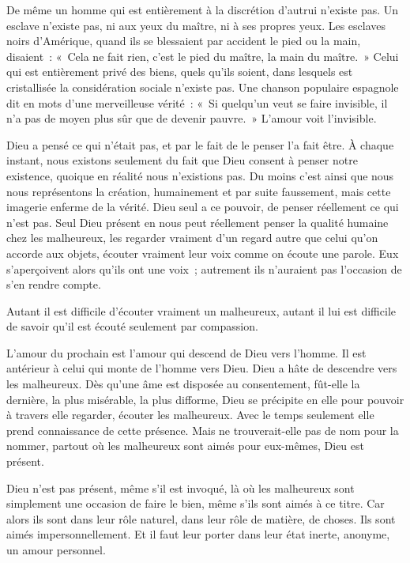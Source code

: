 \documentclass[french,twoside]{book} %
\begin{document}
De même un homme qui est entièrement à la discrétion d'autrui n'existe pas. Un esclave n'existe pas, ni aux yeux du maître, ni à ses propres yeux. Les esclaves noirs d'Amérique, quand ils se blessaient par accident le pied ou la main, disaient : « Cela ne fait rien, c'est le pied du maître, la main du maître. » Celui qui est entièrement privé des biens, quels qu'ils soient, dans lesquels est cristallisée la considération sociale n'existe pas. Une chanson populaire espagnole dit en mots d'une merveilleuse vérité : « Si quelqu'un veut se faire invisible, il n'a pas de moyen plus sûr que de devenir pauvre. » L'amour voit l'invisible.\par
Dieu a pensé ce qui n'était pas, et par le fait de le penser l'a fait être. À chaque instant, nous existons seulement du fait que Dieu consent à penser notre existence, quoique en réalité nous n'existions pas. Du moins c'est ainsi que nous nous représentons la création, humainement et par suite faussement, mais cette imagerie enferme de la vérité. Dieu seul a ce pouvoir, de penser réellement ce qui n'est pas. Seul Dieu présent en nous peut réellement penser la qualité humaine chez les malheureux, les regarder vraiment d'un regard autre que celui qu'on accorde aux objets, écouter vraiment leur voix comme on écoute une parole. Eux s'aperçoivent alors qu'ils ont une voix ; autrement ils n'auraient pas l'occasion de s'en rendre compte.\par
Autant il est difficile d'écouter vraiment un malheureux, autant il lui est difficile de savoir qu'il est écouté seulement par compassion.\par
L'amour du prochain est l'amour qui descend de Dieu vers l'homme. Il est antérieur à celui qui monte de l'homme vers Dieu. Dieu a hâte de descendre vers les malheureux. Dès qu'une âme est disposée au consentement, fût-elle la dernière, la plus misérable, la plus difforme, Dieu se précipite en elle pour pouvoir à travers elle regarder, écouter les malheureux. Avec le temps seulement elle prend connaissance de cette présence. Mais ne trouverait-elle pas de nom pour la nommer, partout où les malheureux sont aimés pour eux-mêmes, Dieu est présent.\par
Dieu n'est pas présent, même s'il est invoqué, là où les malheureux sont simplement une occasion de faire le bien, même s'ils sont aimés à ce titre. Car alors ils sont dans leur rôle naturel, dans leur rôle de matière, de choses. Ils sont aimés impersonnellement. Et il faut leur porter dans leur état inerte, anonyme, un amour personnel.\par
\end{document}
